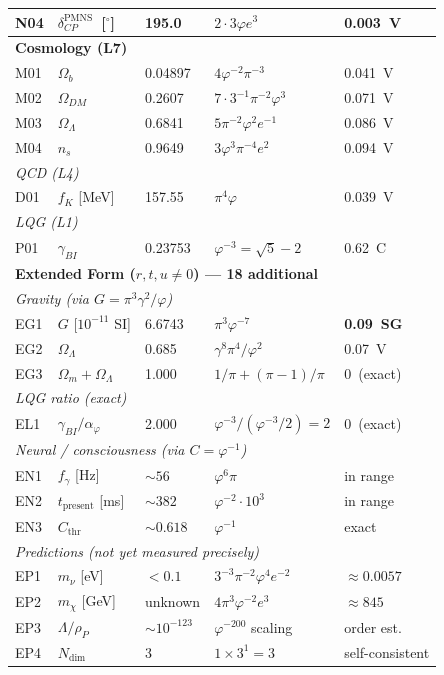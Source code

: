 \documentclass[12pt,a4paper]{article}
\newcommand{\ph}{\varphi}
\newcommand{\aph}{\alpha_{\varphi}}
\newcommand{\gam}{\gamma_{\!BI}}
\begin{document}
\begin{longtable}{@{}lp{2.6cm}lp{4.6cm}l@{}}
N04 & $\delta_{CP}^{\mathrm{PMNS}}$~[$^\circ$] & 195.0 & $2{\cdot}3\ph e^3$ & \textbf{0.003~V} \\
\midrule
\multicolumn{5}{l}{\textcolor{trinityTeal}{\textbf{Cosmology (L7)}}}\\
M01 & $\Omega_b$ & 0.04897 & $4\ph^{-2}\pi^{-3}$ & 0.041~V \\
M02 & $\Omega_{DM}$ & 0.2607 & $7{\cdot}3^{-1}\pi^{-2}\ph^3$ & 0.071~V \\
M03 & $\Omega_\Lambda$ & 0.6841 & $5\pi^{-2}\ph^2 e^{-1}$ & 0.086~V \\
M04 & $n_s$ & 0.9649 & $3\ph^3\pi^{-4}e^2$ & 0.094~V \\
\midrule
\multicolumn{5}{l}{\textit{QCD (L4)}}\\
D01 & $f_K$ [MeV] & 157.55 & $\pi^4\ph$ & 0.039~V \\
\multicolumn{5}{l}{\textit{LQG (L1)}}\\
P01 & $\gamma_{BI}$ & 0.23753 & $\ph^{-3}=\sqrt{5}-2$ & 0.62~C \\
\midrule
\multicolumn{5}{l}{\textcolor{trinityPurple}{\textbf{Extended Form ($r,t,u\ne0$) --- 18 additional}}}\\
\midrule
\multicolumn{5}{l}{\textit{Gravity (via $G=\pi^3\gamma^2/\ph$)}}\\
EG1 & $G$ [$10^{-11}$ SI] & 6.6743 & $\pi^3\ph^{-7}$ & \textbf{0.09~SG} \\
EG2 & $\Omega_\Lambda$ & 0.685 & $\gamma^8\pi^4/\ph^2$ & 0.07~V \\
EG3 & $\Omega_m+\Omega_\Lambda$ & 1.000 & $1/\pi+(\pi{-}1)/\pi$ & 0~(exact) \\
\midrule
\multicolumn{5}{l}{\textit{LQG ratio (exact)}}\\
EL1 & $\gam/\aph$ & 2.000 & $\ph^{-3}/(\ph^{-3}/2) = 2$ & 0~(exact) \\
\midrule
\multicolumn{5}{l}{\textit{Neural / consciousness (via $C=\ph^{-1}$)}}\\
EN1 & $f_\gamma$ [Hz] & $\sim56$ & $\ph^6\pi$ & in range \\
EN2 & $t_{\text{present}}$ [ms] & $\sim382$ & $\ph^{-2}{\cdot}10^3$ & in range \\
EN3 & $C_{\text{thr}}$ & $\sim0.618$ & $\ph^{-1}$ & exact \\
\midrule
\multicolumn{5}{l}{\textit{Predictions (not yet measured precisely)}}\\
EP1 & $m_\nu$ [eV] & $<0.1$ & $3^{-3}\pi^{-2}\ph^4 e^{-2}$ & $\approx0.0057$ \\
EP2 & $m_{\chi}$ [GeV] & unknown & $4\pi^3\ph^{-2}e^3$ & $\approx845$ \\
EP3 & $\Lambda/\rho_P$ & $\sim10^{-123}$ & $\ph^{-200}$ scaling & order est. \\
EP4 & $N_{\text{dim}}$ & 3 & $1\times3^1=3$ & self-consistent \\
\end{longtable}
\end{document}
